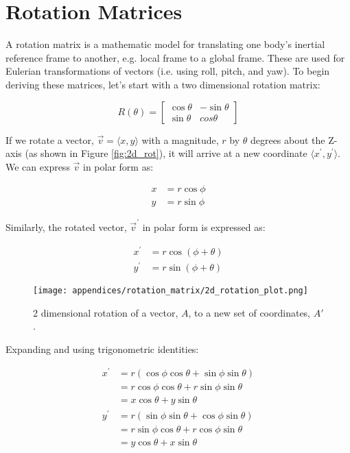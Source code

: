 \chapter{Rotation Matrices} 
A rotation matrix is a mathematic model for translating one body's inertial reference frame to another, e.g. local frame to a global frame.
These are used for Eulerian transformations of vectors (i.e. using roll, pitch, and yaw).
To begin deriving these matrices, let's start with a two dimensional rotation matrix:

\begin{equation*}
    R(\theta) = \left[
        \begin{matrix}
            \cos\theta & -\sin\theta \\
            \sin\theta & cos\theta
        \end{matrix}\right]
\end{equation*}

If we rotate a vector, $\vec{v} = \langle x, y \rangle$ with a magnitude, $r$ by $\theta$ degrees about the Z-axis (as shown in Figure \ref{fig:2d_rot}), it will arrive at a new coordinate $\langle x^{\prime}, y^{\prime}\rangle$. 
We can express $\vec{v}$ in polar form as:

\begin{align}
    x &= r\cos\phi \\
    y &= r\sin\phi
\end{align}

Similarly, the rotated vector, $\vec{v}^{\prime}$ in polar form is expressed as:

\begin{align*}
    x^{\prime} &= r\cos(\phi+\theta) \\
    y^{\prime} &= r\sin(\phi+\theta)
\end{align*}

\begin{figure}[h!]
    \caption{2 dimensional rotation of a vector, $A$, to a new set of coordinates, $A'$.}
    \centering
    \texttt{[image: appendices/rotation\_matrix/2d\_rotation\_plot.png]}
\end{figure}

Expanding and using trigonometric identities:

\begin{align*}
    x^{\prime} &= r(\cos\phi\cos\theta + \sin\phi\sin\theta) \\
               &= r\cos\phi\cos\theta + r\sin\phi\sin\theta \\
               &= x\cos\theta + y\sin\theta \\
    y^{\prime} &= r(\sin\phi\sin\theta + \cos\phi\sin\theta) \\
               &= r\sin\phi\cos\theta + r\cos\phi\sin\theta \\
               &= y\cos\theta + x\sin\theta
\end{align*}

